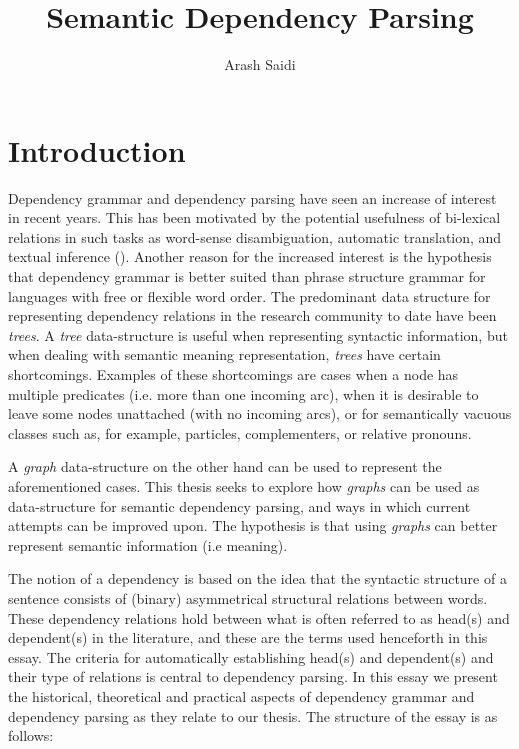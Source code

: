 \documentclass[10pt]{article}
\title{Semantic Dependency Parsing}
\author{Arash Saidi}
\begin{document}
\maketitle{}

\section{Introduction}
Dependency grammar and dependency parsing have seen an increase of interest in recent years. This has been motivated by the potential usefulness of bi-lexical relations in such tasks as word-sense disambiguation, automatic translation, and textual inference (\cite{Nivre05dependencygrammar}). Another reason for the increased interest is the hypothesis that dependency grammar is better suited than phrase structure grammar for languages with free or flexible word order. The predominant data structure for representing dependency relations in the research community to date have been \textit{trees}. A \textit{tree} data-structure is useful when representing syntactic information, but when dealing with semantic meaning representation, \textit{trees} have certain shortcomings. Examples of these shortcomings are cases when a node has multiple predicates (i.e. more than one incoming arc), when it is desirable to leave some nodes unattached (with no incoming arcs), or for semantically vacuous classes such as, for example, particles, complementers, or relative pronouns. 

A \textit{graph} data-structure on the other hand can be used to represent the aforementioned cases. This thesis seeks to explore how \textit{graphs} can be used as data-structure for semantic dependency parsing, and ways in which current attempts can be improved upon. The hypothesis is that using \textit{graphs} can better represent semantic information (i.e meaning).

The notion of a dependency is based on the idea that the syntactic structure of a sentence consists of (binary) asymmetrical structural relations between words. These dependency relations hold between what is often referred to as head(s) and dependent(s) in the literature, and these are the terms used henceforth in this essay. The criteria for automatically establishing head(s) and dependent(s) and their type of relations is central to dependency parsing. In this essay we present the historical, theoretical and practical aspects of dependency grammar and dependency parsing as they relate to our thesis. The structure of the essay is as follows:
\end{document}
